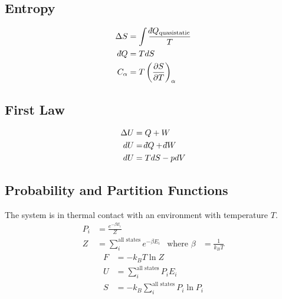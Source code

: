 \documentclass[10pt,twocolumn]{article}
\newcommand\dbar{{\mathchar'26\mkern-12mu d}}
\begin{document}
\subsection*{Entropy}
\begin{align*}
    \Delta S &= \int  \frac{\dbar Q_{\text{quasistatic}}}{T}
    \\
    \dbar Q &= TdS
    \\
    C_\alpha &= T\left(\frac{\partial S}{\partial T}\right)_{\alpha}
\end{align*}

\subsection*{First Law}
\begin{align*}
    \Delta U &= Q + W
    \\
    dU &= \dbar Q + \dbar W
    \\
    dU &= TdS - pdV
\end{align*}


\subsection*{Probability and Partition Functions}
The system is in thermal contact with an environment with temperature $T$.
\begin{align*}
    P_i &= \frac{e^{-\beta E_i}}{Z} \\
    Z &= \sum_i^{\text{all states}} e^{-\beta E_i} & \text{where } \beta &= \frac{1}{k_BT}
\end{align*}
\begin{align*}
    F &= -k_BT \ln Z \\
    U &= \sum_i^{\text{all states}} P_i E_i \\
    S &= -k_B\sum_i^{\text{all states}} P_i \ln P_i
\end{align*}
\end{document}
